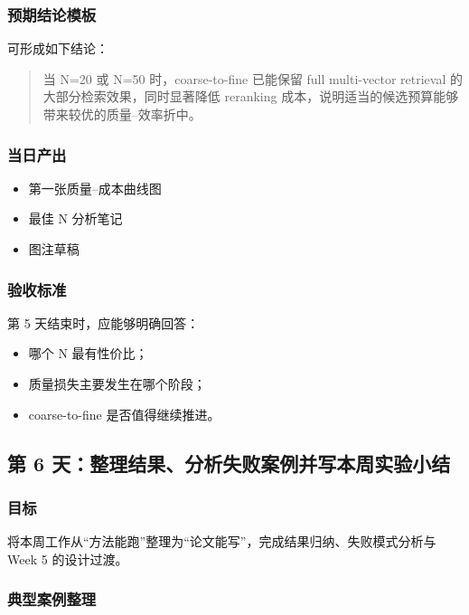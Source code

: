 \documentclass[UTF8,a4paper,12pt]{ctexart}
\begin{document}
	\subsubsection*{预期结论模板}
	
	可形成如下结论：
	
	\begin{quote}
		当 N=20 或 N=50 时，coarse-to-fine 已能保留 full multi-vector retrieval 的大部分检索效果，同时显著降低 reranking 成本，说明适当的候选预算能够带来较优的质量--效率折中。
	\end{quote}
	
	\subsubsection*{当日产出}
	
	\begin{itemize}[leftmargin=2em]
		\item 第一张质量--成本曲线图
		\item 最佳 N 分析笔记
		\item 图注草稿
	\end{itemize}
	
	\subsubsection*{验收标准}
	
	第 5 天结束时，应能够明确回答：
	
	\begin{itemize}[leftmargin=2em]
		\item 哪个 N 最有性价比；
		\item 质量损失主要发生在哪个阶段；
		\item coarse-to-fine 是否值得继续推进。
	\end{itemize}
	
	\subsection{第 6 天：整理结果、分析失败案例并写本周实验小结}
	
	\subsubsection*{目标}
	
	将本周工作从“方法能跑”整理为“论文能写”，完成结果归纳、失败模式分析与 Week 5 的设计过渡。
	
	\subsubsection*{典型案例整理}
	
\end{document}
